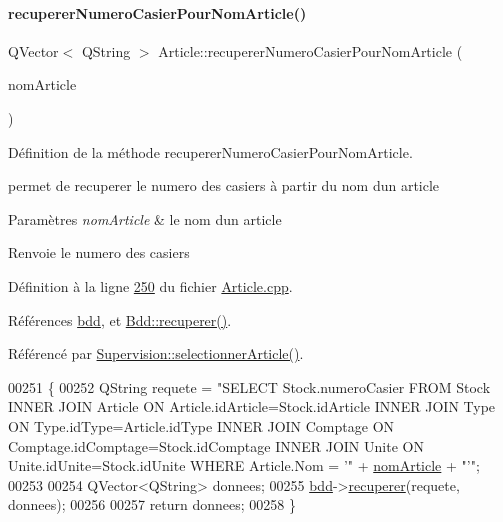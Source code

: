 \paragraph{\texorpdfstring{recuperer\+Numero\+Casier\+Pour\+Nom\+Article()}{recupererNumeroCasierPourNomArticle()}}
{\footnotesize\ttfamily Q\+Vector$<$ Q\+String $>$ Article\+::recuperer\+Numero\+Casier\+Pour\+Nom\+Article (\begin{DoxyParamCaption}\item[{Q\+String}]{nom\+Article }\end{DoxyParamCaption})\hspace{0.3cm}{\ttfamily [static]}}



Définition de la méthode recuperer\+Numero\+Casier\+Pour\+Nom\+Article. 

permet de recuperer le numero des casiers à partir du nom d\textquotesingle{}un article 
\begin{DoxyParams}{Paramètres}
{\em nom\+Article} & le nom d\textquotesingle{}un article \\
\hline
\end{DoxyParams}
\begin{DoxyReturn}{Renvoie}
le numero des casiers 
\end{DoxyReturn}


Définition à la ligne \hyperlink{_article_8cpp_source_l00250}{250} du fichier \hyperlink{_article_8cpp_source}{Article.\+cpp}.



Références \hyperlink{_article_8h_source_l00082}{bdd}, et \hyperlink{_bdd_8cpp_source_l00187}{Bdd\+::recuperer()}.



Référencé par \hyperlink{_supervision_8cpp_source_l00320}{Supervision\+::selectionner\+Article()}.


\begin{DoxyCode}
00251 \{
00252     QString requete = \textcolor{stringliteral}{"SELECT Stock.numeroCasier FROM Stock INNER JOIN Article ON
       Article.idArticle=Stock.idArticle INNER JOIN Type ON Type.idType=Article.idType INNER JOIN Comptage ON
       Comptage.idComptage=Stock.idComptage INNER JOIN Unite ON Unite.idUnite=Stock.idUnite WHERE Article.Nom = '"} + 
      \hyperlink{class_article_a0ba6c08f7dd54e4b7caf673ecd6b41a6}{nomArticle} + \textcolor{stringliteral}{"'"};
00253 
00254     QVector<QString> donnees;
00255     \hyperlink{class_article_a7221cec4212d86d74f479b9ee683ee8a}{bdd}->\hyperlink{class_bdd_a8f25d29d309041bbf875700db0efd97b}{recuperer}(requete, donnees);
00256 
00257     \textcolor{keywordflow}{return} donnees;
00258 \}
\end{DoxyCode}



